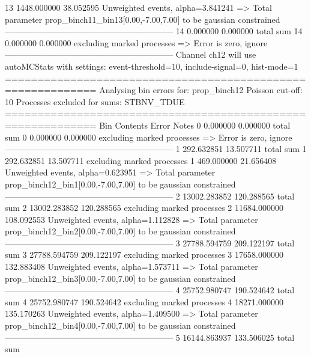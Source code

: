 13         1448.000000     38.052595       Unweighted events, alpha=3.841241
  => Total parameter prop_binch11_bin13[0.00,-7.00,7.00] to be gaussian constrained
------------------------------------------------------------
14         0.000000        0.000000        total sum                     
14         0.000000        0.000000        excluding marked processes    
  => Error is zero, ignore      
------------------------------------------------------------
Channel ch12 will use autoMCStats with settings: event-threshold=10, include-signal=0, hist-mode=1
============================================================
Analysing bin errors for: prop_binch12
Poisson cut-off: 10
Processes excluded for sums: STBNV_TDUE
============================================================
Bin        Contents        Error           Notes                         
0          0.000000        0.000000        total sum                     
0          0.000000        0.000000        excluding marked processes    
  => Error is zero, ignore      
------------------------------------------------------------
1          292.632851      13.507711       total sum                     
1          292.632851      13.507711       excluding marked processes    
1          469.000000      21.656408       Unweighted events, alpha=0.623951
  => Total parameter prop_binch12_bin1[0.00,-7.00,7.00] to be gaussian constrained
------------------------------------------------------------
2          13002.283852    120.288565      total sum                     
2          13002.283852    120.288565      excluding marked processes    
2          11684.000000    108.092553      Unweighted events, alpha=1.112828
  => Total parameter prop_binch12_bin2[0.00,-7.00,7.00] to be gaussian constrained
------------------------------------------------------------
3          27788.594759    209.122197      total sum                     
3          27788.594759    209.122197      excluding marked processes    
3          17658.000000    132.883408      Unweighted events, alpha=1.573711
  => Total parameter prop_binch12_bin3[0.00,-7.00,7.00] to be gaussian constrained
------------------------------------------------------------
4          25752.980747    190.524642      total sum                     
4          25752.980747    190.524642      excluding marked processes    
4          18271.000000    135.170263      Unweighted events, alpha=1.409500
  => Total parameter prop_binch12_bin4[0.00,-7.00,7.00] to be gaussian constrained
------------------------------------------------------------
5          16144.863937    133.506025      total sum                     
